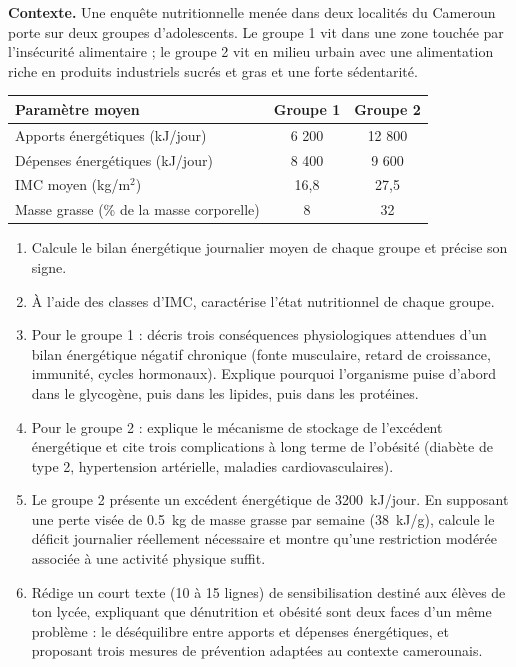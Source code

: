 \documentclass[11pt]{article}
\begin{document}
\begin{exercice}
\textbf{Contexte.} Une enquête nutritionnelle menée dans deux localités du Cameroun porte sur deux groupes d'adolescents. Le groupe 1 vit dans une zone touchée par l'insécurité alimentaire ; le groupe 2 vit en milieu urbain avec une alimentation riche en produits industriels sucrés et gras et une forte sédentarité.

\begin{center}
\begin{tabularx}{\linewidth}{|X|c|c|}
\hline
\rowcolor{popgreen!40} \textbf{Paramètre moyen} & \textbf{Groupe 1} & \textbf{Groupe 2} \\
\hline
Apports énergétiques (kJ/jour) & 6 200 & 12 800 \\
\hline
Dépenses énergétiques (kJ/jour) & 8 400 & 9 600 \\
\hline
IMC moyen (kg/m$^2$) & 16,8 & 27,5 \\
\hline
Masse grasse (\% de la masse corporelle) & 8 & 32 \\
\hline
\end{tabularx}
\end{center}

\begin{enumerate}
\item Calcule le bilan énergétique journalier moyen de chaque groupe et précise son signe.
\item À l'aide des classes d'IMC, caractérise l'état nutritionnel de chaque groupe.
\item Pour le groupe 1 : décris trois conséquences physiologiques attendues d'un bilan énergétique négatif chronique (fonte musculaire, retard de croissance, immunité, cycles hormonaux). Explique pourquoi l'organisme puise d'abord dans le glycogène, puis dans les lipides, puis dans les protéines.
\item Pour le groupe 2 : explique le mécanisme de stockage de l'excédent énergétique et cite trois complications à long terme de l'obésité (diabète de type 2, hypertension artérielle, maladies cardiovasculaires).
\item Le groupe 2 présente un excédent énergétique de \SI{3200}{kJ/jour}. En supposant une perte visée de \SI{0,5}{kg} de masse grasse par semaine (\SI{38}{kJ/g}), calcule le déficit journalier réellement nécessaire et montre qu'une restriction modérée associée à une activité physique suffit.
\item Rédige un court texte (10 à 15 lignes) de sensibilisation destiné aux élèves de ton lycée, expliquant que dénutrition et obésité sont deux faces d'un même problème : le déséquilibre entre apports et dépenses énergétiques, et proposant trois mesures de prévention adaptées au contexte camerounais.
\end{enumerate}
\end{exercice}
\end{document}
